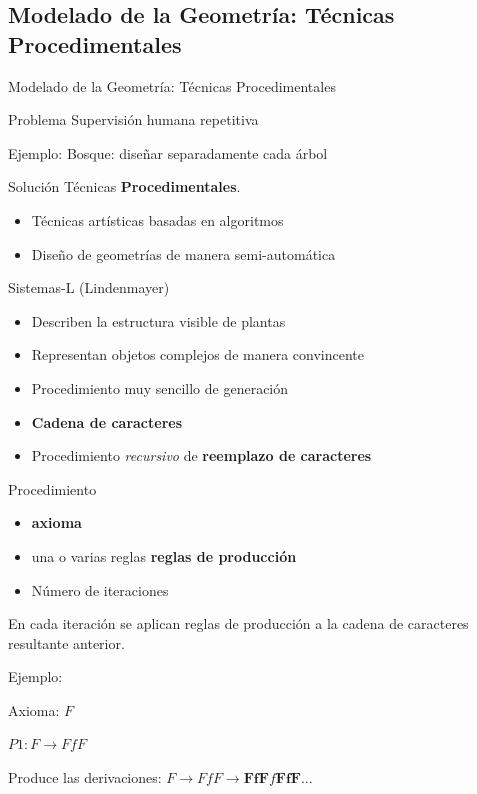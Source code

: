 \documentclass[spanish,unknownkeysallowed]{beamer}
\begin{document}
\subsection{Modelado de la Geometría: Técnicas Procedimentales}
\begin{frame}{Modelado de la Geometría: Técnicas Procedimentales}

\begin{block}{Problema}
Supervisión humana repetitiva

Ejemplo: Bosque: diseñar separadamente cada árbol
\end{block}

\vspace{0.5cm}
\begin{block}{Solución}
Técnicas \textbf{Procedimentales}.
\begin{itemize}
\item Técnicas artísticas basadas en algoritmos
\item Diseño de geometrías de manera semi-automática
\end{itemize}
\end{block}

\end{frame}

\begin{frame}{Sistemas-L}
(Lindenmayer)

\begin{itemize}
\item Describen la estructura visible de plantas
\item Representan objetos complejos de manera convincente
\item Procedimiento muy sencillo de generación
\item \textbf{Cadena de caracteres}
\item Procedimiento {\it recursivo} de \textbf{reemplazo de caracteres}
\end{itemize}


\end{frame}

\begin{frame}

Procedimiento
\begin{itemize}
\item \textbf{axioma}
\item una o varias reglas \textbf{reglas de producción}
\item Número de iteraciones
\end{itemize}

En cada iteración se aplican reglas de producción a la cadena de caracteres resultante anterior.

\vspace{1cm}

Ejemplo:

Axioma: $F$

$P1: F \rightarrow FfF$

Produce las derivaciones:
$F \rightarrow FfF \rightarrow \textbf{FfF}f\textbf{FfF} \ldots$

\end{frame}
\end{document}
